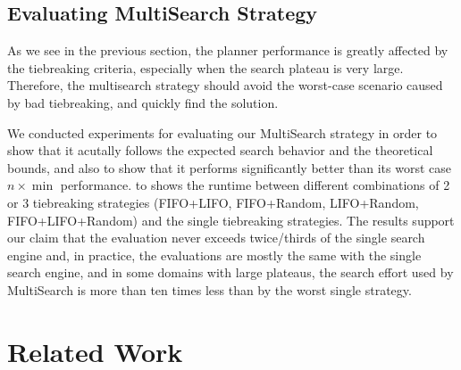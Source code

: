 \begin{figure}[htbp]
 \centering
 \caption{}
 \label{depth}
\end{figure}


\subsection{Evaluating MultiSearch Strategy}

As we see in the previous section, the planner performance is greatly
affected by the tiebreaking criteria, especially when the search plateau
is very large. Therefore, the multisearch strategy should avoid the
worst-case scenario caused by bad tiebreaking, and quickly find the solution.

We conducted experiments for evaluating our MultiSearch
strategy in order to show that it acutally follows the expected search
behavior and the theoretical bounds, and also to show that it performs
significantly better than its worst case $n \times \min$ performance.
 to  shows the runtime between
different combinations of 2 or 3 tiebreaking strategies (FIFO+LIFO,
FIFO+Random, LIFO+Random, FIFO+LIFO+Random) and the single tiebreaking
strategies. The results support our claim that the evaluation never
exceeds twice/thirds of the single search engine and, in practice, the
evaluations are mostly the same with the single search engine, and in
some domains with large plateaus, the search effort used by MultiSearch
is more than ten times less than by the worst single strategy.

\begin{figure}[htbp]
 \centering
 \caption{}
 \label{portfolio-ff}
\end{figure}


\section{Related Work}
\label{sec-4}

